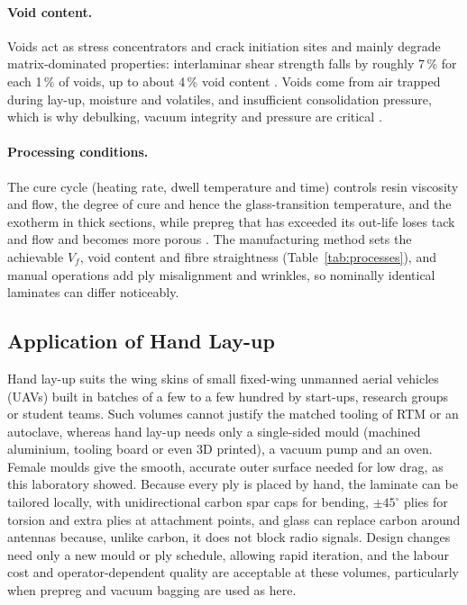 \documentclass[11pt,a4paper]{article}
\newenvironment{addedblock}{\color{addgreen}}{}
\newenvironment{addedblock}{}{}
\begin{document}
\begin{addedblock}
\paragraph{Void content.} Voids act as stress concentrators and crack
initiation sites and mainly degrade matrix-dominated properties:
interlaminar shear strength falls by roughly 7\,\% for each 1\,\% of
voids, up to about 4\,\% void content \citep{judd1978}. Voids come from
air trapped during lay-up, moisture and volatiles, and insufficient
consolidation pressure, which is why debulking, vacuum integrity and
pressure are critical \citep{centea2015}.

\paragraph{Processing conditions.} The cure cycle (heating rate, dwell
temperature and time) controls resin viscosity and flow, the degree of
cure and hence the glass-transition temperature, and the exotherm in
thick sections, while prepreg that has exceeded its out-life loses
tack and flow and becomes more porous \citep{hexcel2013}. The
manufacturing method sets the achievable $V_f$, void content and fibre
straightness (Table~\ref{tab:processes}), and manual operations add
ply misalignment and wrinkles, so nominally identical laminates can
differ noticeably.

\subsection{Application of Hand Lay-up}

Hand lay-up suits the wing skins of small fixed-wing unmanned aerial
vehicles (UAVs) built in batches of a few to a few hundred by
start-ups, research groups or student teams. Such volumes cannot
justify the matched tooling of RTM or an autoclave, whereas hand
lay-up needs only a single-sided mould (machined aluminium, tooling
board or even 3D printed), a vacuum pump and an oven. Female moulds
give the smooth, accurate outer surface needed for low drag, as this
laboratory showed. Because every ply is placed by hand, the laminate
can be tailored locally, with unidirectional carbon spar caps for
bending, $\pm45^\circ$ plies for torsion and extra plies at attachment
points, and glass can replace carbon around antennas because, unlike
carbon, it does not block radio signals. Design changes need only a
new mould or ply schedule, allowing rapid iteration, and the labour
cost and operator-dependent quality are acceptable at these volumes,
particularly when prepreg and vacuum bagging are used as here.
\end{addedblock}
\end{document}
